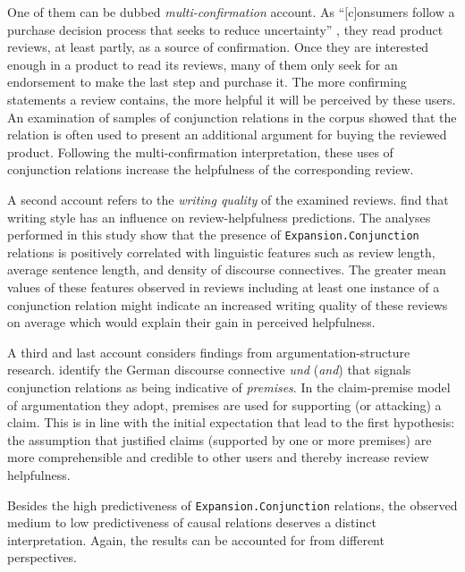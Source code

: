 \documentclass[
    a4paper,%
    12pt,%
    oneside,%
    toc=bibliography,
    final,
]{scrartcl}
\begin{document}
One of them can be dubbed \textit{multi-confirmation} account. As “[c]onsumers follow a purchase decision process that seeks to reduce uncertainty” \citep[187]{MudambiSchuff2010}, they read product reviews, at least partly, as a source of confirmation. Once they are interested enough in a product to read its reviews, many of them only seek for an endorsement to make the last step and purchase it. The more confirming statements a review contains, the more helpful it will be perceived by these users. An examination of samples of conjunction relations in the corpus showed that the relation is often used to present an additional argument for buying the reviewed product. Following the multi-confirmation interpretation, these uses of conjunction relations increase the helpfulness of the corresponding review.

A second account refers to the \textit{writing quality} of the examined reviews. \citet{Liu2008} find that writing style has an influence on review-helpfulness predictions. The analyses performed in this study show that the presence of \lstinline|Expansion.Conjunction| relations is positively correlated with linguistic features such as review length, average sentence length, and density of discourse connectives. The greater mean values of these features observed in reviews including at least one instance of a conjunction relation might indicate an increased writing quality of these reviews on average which would explain their gain in perceived helpfulness.

A third and last account considers findings from argumentation-structure research. \citet[2239]{Eckle-Kohler2015} identify the German discourse connective \textit{und} (\textit{and}) that signals conjunction relations as being indicative of \textit{premises}. In the claim-premise model of argumentation they adopt, premises are used for supporting (or attacking) a claim. This is in line with the initial expectation that lead to the first hypothesis: the assumption that justified claims (supported by one or more premises) are more comprehensible and credible to other users and thereby increase review helpfulness.


Besides the high predictiveness of \lstinline|Expansion.Conjunction| relations, the observed medium to low predictiveness of causal relations deserves a distinct interpretation. Again, the results can be accounted for from different perspectives.
\end{document}
